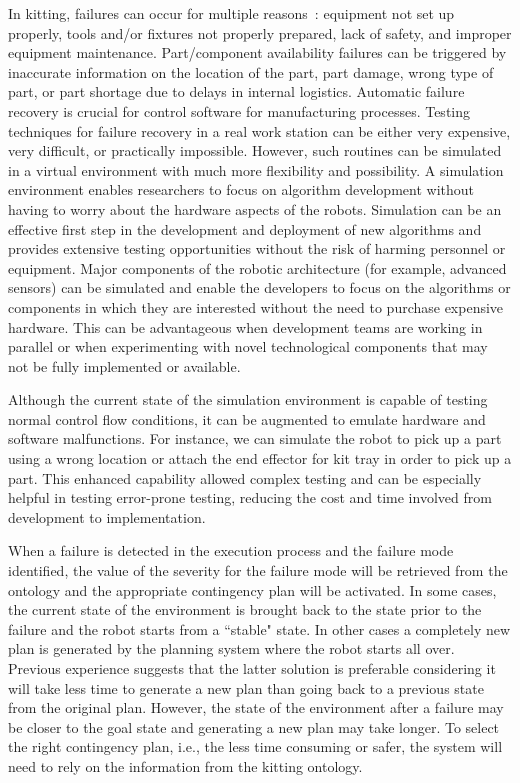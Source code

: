 \documentclass[final,3p,12pt]{elsarticle}
\begin{document}
In kitting, failures can occur for multiple reasons~\cite{Leger.1999,Kaiser.2007}: equipment not set up properly,
tools and/or fixtures not properly prepared, lack of safety, and improper equipment
maintenance. Part/component availability failures can be triggered by inaccurate information
on the location of the part, part damage, wrong type of part, or part shortage due to delays
in internal logistics.
Automatic failure recovery is crucial for control software for manufacturing processes. Testing techniques for failure recovery in a real work station can be either very expensive, very difficult, or practically impossible. However, such routines can be simulated in a virtual environment with much more flexibility and possibility. A simulation environment enables researchers to focus on algorithm development without having to worry about the hardware aspects of the robots. Simulation can be an effective first step in the development and deployment of new algorithms and provides extensive testing opportunities without the risk of harming personnel or equipment. Major components of the robotic architecture (for example, advanced sensors) can be simulated and enable the developers to focus on the algorithms or components in which they are interested without the need to purchase expensive hardware. This can be advantageous when development teams are working in parallel or when experimenting with novel technological components that may not be fully implemented or available.

Although the current state of the simulation environment is capable of testing normal control flow conditions, it can be augmented to emulate hardware and software malfunctions. For instance, we can simulate the robot to pick up a part using a wrong location or attach the end effector for kit tray in order to pick up a part. This enhanced capability allowed complex testing and can be especially helpful in testing error-prone testing, reducing the cost and time involved from development to implementation.

When a failure is detected in the execution process and the failure mode identified, the
value of the severity for the failure mode will be retrieved from the ontology and the
appropriate contingency plan will be activated. In some cases, the current state of the environment is brought back to the state prior to the failure and the robot starts from a
``stable" state. In other cases a completely new plan is generated by the planning system
where the robot starts all over. Previous experience suggests that the latter solution is
preferable considering it will take less time to generate a new plan than going back to a
previous state from the original plan. However, the state of the environment after a failure
may be closer to the goal state and generating a new plan may take longer. To
select the right contingency plan, i.e., the less time consuming or safer, the system will
need to rely on the information from the kitting ontology.
\end{document}
